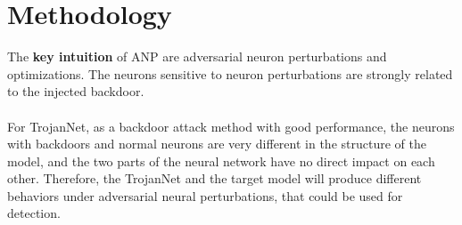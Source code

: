 \documentclass[english,version-2022-01]{uzl-thesis}
\begin{document}
\section{Methodology}\label{anp}The \textbf{key intuition} of ANP are adversarial neuron perturbations and optimizations. The neurons sensitive to neuron perturbations are strongly related to the injected backdoor. \\
\\
For TrojanNet, as a backdoor attack method with good performance, the neurons with backdoors and normal neurons are very different in the structure of the model, and the two parts of the neural network have no direct impact on each other. Therefore, the TrojanNet and the target model will produce different behaviors under adversarial neural perturbations, that could be used for detection.\\
\end{document}
